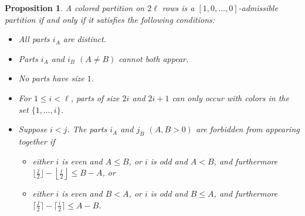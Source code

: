 \documentclass[10pt,a4paper]{amsart}
\numberwithin{equation}{section}
\newtheorem{Proposition}[Theorem]{Proposition}
\theoremstyle{definition}
\begin{document}
\begin{Proposition} \label{pr:eq}
A colored partition on $2\ell$ rows is a $[1,0,\dots,0]$-admissible partition if and only if it satisfies the following conditions:
\begin{itemize}\itemsep=0pt
\item All parts $i_A$ are distinct.
\item Parts $i_A$ and $i_B$ $(A\ne B)$ cannot both appear.
\item No parts have size $1$.
\item For $1\le i < \ell$, parts of size $2i$ and $2i+1$ can only occur with colors in the set $\{1,\dots,i\}$.
\item Suppose $i< j$. The parts $i_A$ and $j_{B}$ $(A,B>0)$ are forbidden from appearing together if
\begin{itemize}\itemsep=0pt
\item either $i$ is even and $A \le B$, or $i$ is odd and $A < B$, and furthermore $ \bigl\lfloor\frac j2\bigr\rfloor-\left\lfloor\frac i2\right\rfloor\le B-A$, or
\item either $i$ is even and $B< A$, or $i$ is odd and $B\le A$, and furthermore
$ \bigl\lceil\frac j2\bigr\rceil-\bigl\lceil\frac i2\bigr\rceil\le A-B$.
\end{itemize}
\end{itemize}
\end{Proposition}
\end{document}
